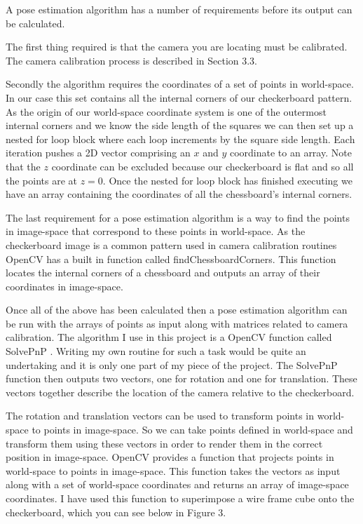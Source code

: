 \documentclass{article}
\begin{document}

A pose estimation algorithm has a number of requirements before its output can be calculated. \par

The first thing required is that the camera you are locating must be calibrated. The camera calibration process is described in Section 3.3. \par

Secondly the algorithm requires the coordinates of a set of points in world-space. In our case this set contains all the internal corners of our checkerboard pattern. As the origin of our world-space coordinate system is one of the outermost internal corners and we know the side length of the squares we can then set up a nested for loop block where each loop increments by the square side length. Each iteration pushes a 2D vector comprising an $x$ and $y$ coordinate to an array. Note that the $z$ coordinate can be excluded because our checkerboard is flat and so all the points are at $z = 0$. Once the nested for loop block has finished executing we have an array containing the coordinates of all the chessboard's internal corners. \par

The last requirement for a pose estimation algorithm is a way to find the points in image-space that correspond to these points in world-space. As the checkerboard image is a common pattern used in camera calibration routines OpenCV has a built in function called findChessboardCorners. This function locates the internal corners of a chessboard and outputs an array of their coordinates in image-space. \par

Once all of the above has been calculated then a pose estimation algorithm can be run with the arrays of points as input along with matrices related to camera calibration. The algorithm I use in this project is a OpenCV function called SolvePnP \cite{calib3}. Writing my own routine for such a task would be quite an undertaking and it is only one part of my piece of the project. The SolvePnP function then outputs two vectors, one for rotation and one for translation. These vectors together describe the location of the camera relative to the checkerboard. \par

The rotation and translation vectors can be used to transform points in world-space to points in image-space. So we can take points defined in world-space and transform them using these vectors in order to render them in the correct position in image-space. OpenCV provides a function that projects points in world-space to points in image-space. This function takes the vectors as input along with a set of world-space coordinates and returns an array of image-space coordinates. I have used this function to superimpose a wire frame cube onto the checkerboard, which you can see below in Figure 3.
\end{document}
